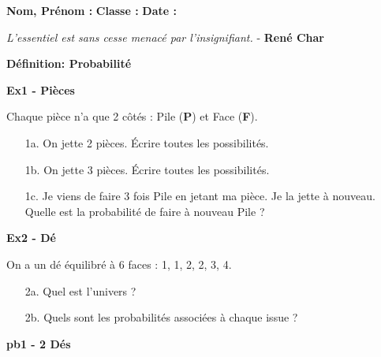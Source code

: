 



\textbf{Nom, Prénom :} \hspace{8cm} \textbf{Classe :} \hspace{3cm} \textbf{Date :}\\

\begin{center}
  \textit{L’essentiel est sans cesse menacé par l’insignifiant.} - \textbf{René Char}
\end{center}

\textbf{Définition: Probabilité} \\ \Pointilles[2]

\textbf{Ex1 - Pièces}

Chaque pièce n'a que 2 côtés : Pile (\textbf{P}) et Face (\textbf{F}).

\begin{enumerate}
  \item[1a.] On jette 2 pièces. Écrire toutes les possibilités. \\\Pointilles[1]
  \item[1b.] On jette 3 pièces. Écrire toutes les possibilités. \\\Pointilles[3]
  \item[1c.] Je viens de faire 3 fois Pile en jetant ma pièce. Je la jette à nouveau. Quelle est la probabilité de faire à nouveau Pile ? \dotfill
\end{enumerate}  

\textbf{Ex2 - Dé}

On a un dé équilibré à 6 faces : 1, 1, 2, 2, 3, 4.

\begin{enumerate}
  \item[2a.] Quel est l'univers ? \dotfill
  \item[2b.] Quels sont les probabilités associées à chaque issue ? \\ \Pointilles[2]
\end{enumerate}  


\textbf{pb1 - 2 Dés}

